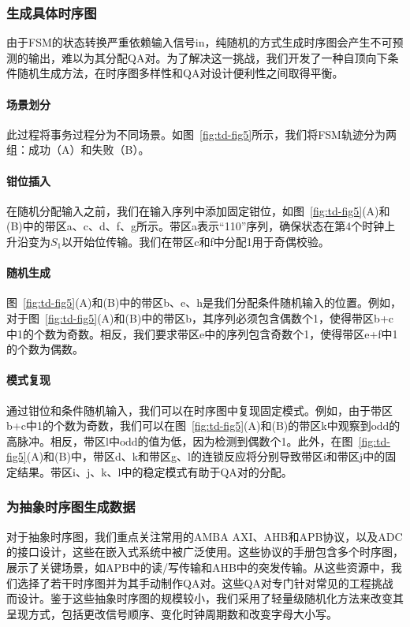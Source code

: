 \subsubsection{生成具体时序图}

由于FSM的状态转换严重依赖输入信号$\text{in}$，纯随机的方式生成时序图会产生不可预测的输出，难以为其分配QA对。为了解决这一挑战，我们开发了一种自顶向下条件随机生成方法，在时序图多样性和QA对设计便利性之间取得平衡。

\paragraph{场景划分}
此过程将事务过程分为不同场景。如图~\ref{fig:td-fig5}所示，我们将FSM轨迹分为两组：成功（A）和失败（B）。

\paragraph{钳位插入}
在随机分配输入之前，我们在输入序列中添加固定钳位，如图~\ref{fig:td-fig5}(A)和(B)中的带区a、c、d、f、g所示。带区a表示“110”序列，确保状态在第4个时钟上升沿变为$S_1$以开始位传输。我们在带区c和f中分配1用于奇偶校验。

\paragraph{随机生成}
图~\ref{fig:td-fig5}(A)和(B)中的带区b、e、h是我们分配条件随机输入的位置。例如，对于图~\ref{fig:td-fig5}(A)和(B)中的带区b，其序列必须包含偶数个1，使得带区b+c中1的个数为奇数。相反，我们要求带区e中的序列包含奇数个1，使得带区e+f中1的个数为偶数。

\paragraph{模式复现}
通过钳位和条件随机输入，我们可以在时序图中复现固定模式。例如，由于带区b+c中1的个数为奇数，我们可以在图~\ref{fig:td-fig5}(A)和(B)的带区k中观察到$\text{odd}$的高脉冲。相反，带区l中$\text{odd}$的值为低，因为检测到偶数个1。此外，在图~\ref{fig:td-fig5}(A)和(B)中，带区d、k和带区g、l的连锁反应将分别导致带区i和带区j中的固定结果。带区i、j、k、l中的稳定模式有助于QA对的分配。

\subsubsection{为抽象时序图生成数据}

对于抽象时序图，我们重点关注常用的AMBA AXI、AHB和APB协议，以及ADC的接口设计，这些在嵌入式系统中被广泛使用。这些协议的手册包含多个时序图，展示了关键场景，如APB中的读/写传输和AHB中的突发传输。从这些资源中，我们选择了若干时序图并为其手动制作QA对。这些QA对专门针对常见的工程挑战而设计。鉴于这些抽象时序图的规模较小，我们采用了轻量级随机化方法来改变其呈现方式，包括更改信号顺序、变化时钟周期数和改变字母大小写。

